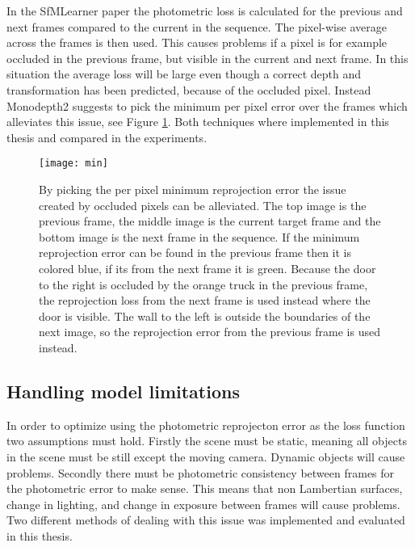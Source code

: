 \iffalse
\paragraph{Disparity loss} To encourage background depths (low disparities) in shadows of the depth map where occlusion has occurred a penalty on the disparity can be added $ \mathcal{L}_{o} =|d_t|. $
\fi

In the SfMLearner paper the photometric loss is calculated for the previous and next frames compared to the current in the sequence. The pixel-wise average across the frames is then used. This causes problems if a pixel is for example occluded in the previous frame, but visible in the current and next frame. In this situation the average loss will be large even though a correct depth and transformation has been predicted, because of the occluded pixel. Instead Monodepth2 suggests to pick the minimum per pixel error over the frames which alleviates this issue, see Figure \ref{fig:min}. Both techniques where implemented in this thesis and compared in the experiments.

\begin{figure}[H]
	\centering
	\texttt{[image: min]}
	\caption{By picking the per pixel minimum reprojection error the issue created by occluded pixels can be alleviated. The top image is the previous frame, the middle image is the current target frame and the bottom image is the next frame in the sequence. If the minimum reprojection error can be found in the previous frame then it is colored blue, if its from the next frame it is green. Because the door to the right is occluded by the orange truck in the previous frame, the reprojection loss from the next frame is used instead where the door is visible. The wall to the left is outside the boundaries of the next image, so the reprojection error from the previous frame is used instead.}
	\label{fig:min}
\end{figure}

\subsection{Handling model limitations}
\label{sec:modellimit}

In order to optimize using the photometric reprojecton error as the loss function two assumptions must hold. Firstly the scene must be static, meaning all objects in the scene must be still except the moving camera. Dynamic objects will cause problems. Secondly there must be photometric consistency between frames for the photometric error to make sense. This means that non Lambertian surfaces, change in lighting, and change in exposure between frames will cause problems. Two different methods of dealing with this issue was implemented and evaluated in this thesis.

